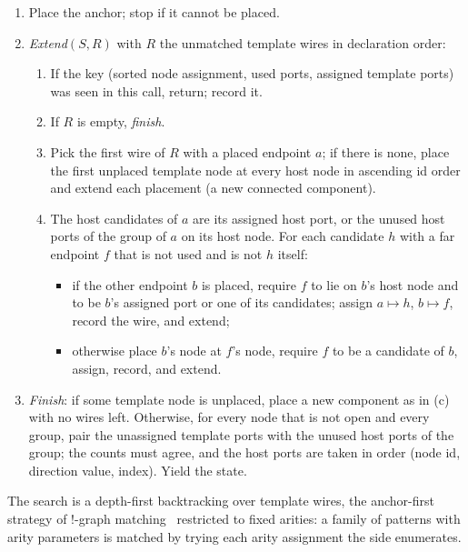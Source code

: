 \begin{algorithm}\label{alg:rewriting-subgraph}
\leavevmode
\begin{enumerate}
\item Place the anchor; stop if it cannot be placed.
\item \emph{Extend}$(S, R)$ with $R$ the unmatched template wires in declaration order:
  \begin{enumerate}
  \item If the key (sorted node assignment, used ports, assigned template ports) was seen in this
    call, return; record it.
  \item If $R$ is empty, \emph{finish}.
  \item Pick the first wire of $R$ with a placed endpoint $a$; if there is none, place the first
    unplaced template node at every host node in ascending id order and extend each placement
    (a new connected component).
  \item The host candidates of $a$ are its assigned host port, or the unused host ports of the
    group of $a$ on its host node. For each candidate $h$ with a far endpoint $f$ that is not used
    and is not $h$ itself:
    \begin{itemize}
    \item if the other endpoint $b$ is placed, require $f$ to lie on $b$'s host node and to be
      $b$'s assigned port or one of its candidates; assign $a\mapsto h$, $b\mapsto f$, record the
      wire, and extend;
    \item otherwise place $b$'s node at $f$'s node, require $f$ to be a candidate of $b$, assign,
      record, and extend.
    \end{itemize}
  \end{enumerate}
\item \emph{Finish}: if some template node is unplaced, place a new component as in (c) with no
  wires left. Otherwise, for every node that is not open and every group, pair the unassigned
  template ports with the unused host ports of the group; the counts must agree, and the host
  ports are taken in order (node id, direction value, index). Yield the state.
\end{enumerate}
\end{algorithm}

The search is a depth-first backtracking over template wires, the anchor-first strategy of
!-graph matching~\cite{kissinger2014pattern} restricted to fixed arities: a family of patterns
with arity parameters is matched by trying each arity assignment the side enumerates.

